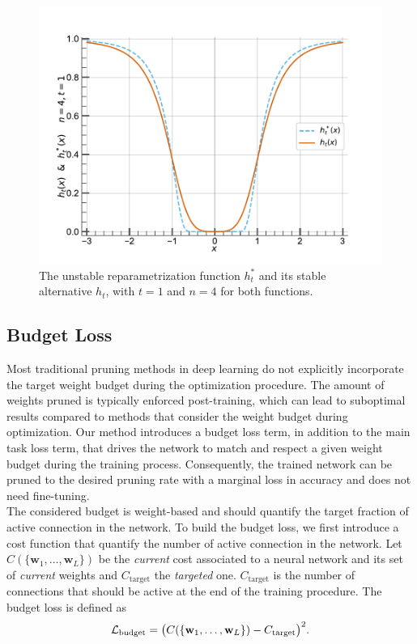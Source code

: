 \begin{figure}
  \centering
  \centerline{\includegraphics[width=0.49\linewidth]{chapter_1/assets/h_stable_vs_unstable.pdf}}
  \caption{\centering The unstable reparametrization function $h_t^*$ and its
  stable alternative $h_t$, with $t=1$ and $n=4$ for both functions.} 
  \label{fig:chap1:h_stable_vs_unstable}
\end{figure}

\subsection{Budget Loss}
\label{sec:chap1:budget_loss}

Most traditional pruning methods in deep learning do not explicitly incorporate
the target weight budget during the optimization procedure. The amount of
weights pruned is typically enforced post-training, which can lead to suboptimal
results compared to methods that consider the weight budget during optimization.
Our method introduces a budget loss term, in addition to the main task loss
term, that drives the network to match and respect a given weight budget during
the training process. Consequently, the trained network can be pruned to the
desired pruning rate with a marginal loss in accuracy and does not need
fine-tuning.\\


The considered budget is weight-based and should quantify the target fraction of
active connection in the network. To build the budget loss, we first introduce a
cost function that quantify the number of active connection in the network. Let
$C(\{\mathbf{w}_1,\dots, \mathbf{w}_L\})$ be the {\em current} cost associated
to a neural network and its set of {\em current} weights and $C_\text{target}$
the {\em targeted} one. $C_\text{target}$ is the number of connections that
should be active at the end of the training procedure. The budget loss is
defined as \\

\begin{equation}
  \label{eqn:chap1:simple_budget}
  {\cal L}_\text{budget} = \bigl( C(\{\mathbf{w}_1,\dots, \mathbf{w}_L\}) - C_\text{target} \bigr)^2.
\end{equation} \\



